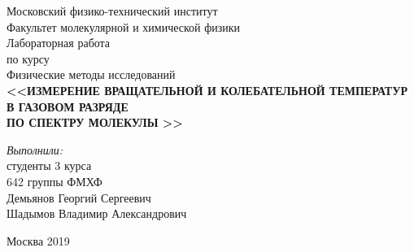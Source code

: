 \begin{titlepage}
\begin{center} 
 
\large Московский физико-технический институт\\
Факультет молекулярной и химической физики\\
\vspace{7cm}
\Large Лабораторная работа \\по курсу \\ Физические методы исследований\\
\textbf{\Huge <<ИЗМЕРЕНИЕ ВРАЩАТЕЛЬНОЙ И КОЛЕБАТЕЛЬНОЙ ТЕМПЕРАТУР\\ В
	ГАЗОВОМ РАЗРЯДЕ\\
	ПО СПЕКТРУ МОЛЕКУЛЫ >>}\\
\end{center} 

\vspace{5cm}
{\par \raggedleft \large \emph{Выполнили:}\\ студенты 3 курса\\ 642 группы ФМХФ\\ Демьянов Георгий Сергеевич \\ Шадымов Владимир Александрович\par}
\begin{center}
\vfill Москва 2019
\end{center}
\end{titlepage}
\newpage
\setcounter{page}{2}